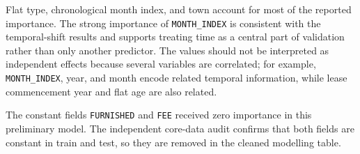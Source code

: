 \documentclass[10pt]{article}
\begin{document}
Flat type, chronological month index, and town account for most of the reported importance.
The strong importance of \texttt{MONTH\_INDEX} is consistent with the temporal-shift results and supports treating time as a central part of validation rather than only another predictor.
The values should not be interpreted as independent effects because several variables are correlated; for example, \texttt{MONTH\_INDEX}, year, and month encode related temporal information, while lease commencement year and flat age are also related.

The constant fields \texttt{FURNISHED} and \texttt{FEE} received zero importance in this preliminary model.
The independent core-data audit confirms that both fields are constant in train and test, so they are removed in the cleaned modelling table.
\end{document}
